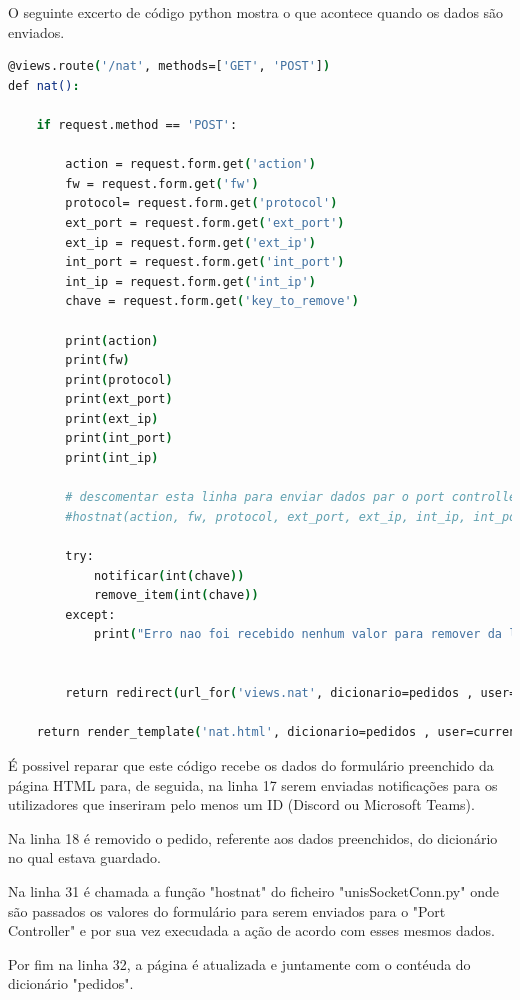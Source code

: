 O seguinte excerto de código python mostra o que acontece quando os dados são enviados.
\begin{lstlisting}[language=csh, caption={Código em python da interface web}]
@views.route('/nat', methods=['GET', 'POST']) 
def nat():

    if request.method == 'POST':
            
        action = request.form.get('action')
        fw = request.form.get('fw')
        protocol= request.form.get('protocol')
        ext_port = request.form.get('ext_port')
        ext_ip = request.form.get('ext_ip')
        int_port = request.form.get('int_port')
        int_ip = request.form.get('int_ip')
        chave = request.form.get('key_to_remove')

        print(action)
        print(fw)
        print(protocol)
        print(ext_port)
        print(ext_ip)
        print(int_port)
        print(int_ip)

        # descomentar esta linha para enviar dados par o port controller
        #hostnat(action, fw, protocol, ext_port, ext_ip, int_ip, int_port)

        try:
            notificar(int(chave))
            remove_item(int(chave))
        except:
            print("Erro nao foi recebido nenhum valor para remover da lista de pedidos")

            
        return redirect(url_for('views.nat', dicionario=pedidos , user=current_user))

    return render_template('nat.html', dicionario=pedidos , user=current_user)
\end{lstlisting}

É possivel reparar que este código recebe os dados do formulário preenchido da página HTML
para, de seguida, na linha 17 serem enviadas notificações para os utilizadores que inseriram
pelo menos um ID (Discord ou Microsoft Teams).

Na linha 18 é removido o pedido, referente aos dados preenchidos, do dicionário no qual estava guardado.

Na linha 31 é chamada a função "hostnat" do ficheiro "unisSocketConn.py" onde são passados 
os valores do formulário para serem enviados para o "Port Controller" e por sua vez execudada
a ação de acordo com esses mesmos dados.

Por fim na linha 32, a página é atualizada e juntamente com o contéuda do dicionário "pedidos".





